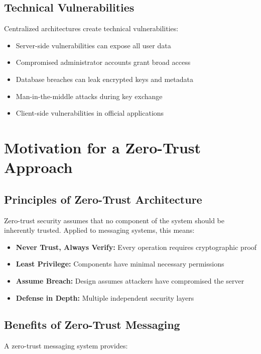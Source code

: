 \subsection{Technical Vulnerabilities}

Centralized architectures create technical vulnerabilities:
\begin{itemize}
    \item Server-side vulnerabilities can expose all user data
    \item Compromised administrator accounts grant broad access
    \item Database breaches can leak encrypted keys and metadata
    \item Man-in-the-middle attacks during key exchange
    \item Client-side vulnerabilities in official applications
\end{itemize}

\section{Motivation for a Zero-Trust Approach}

\subsection{Principles of Zero-Trust Architecture}

Zero-trust security assumes that no component of the system should be inherently trusted. Applied to messaging systems, this means:

\begin{itemize}
    \item \textbf{Never Trust, Always Verify:} Every operation requires cryptographic proof
    \item \textbf{Least Privilege:} Components have minimal necessary permissions
    \item \textbf{Assume Breach:} Design assumes attackers have compromised the server
    \item \textbf{Defense in Depth:} Multiple independent security layers
\end{itemize}

\subsection{Benefits of Zero-Trust Messaging}

A zero-trust messaging system provides:

